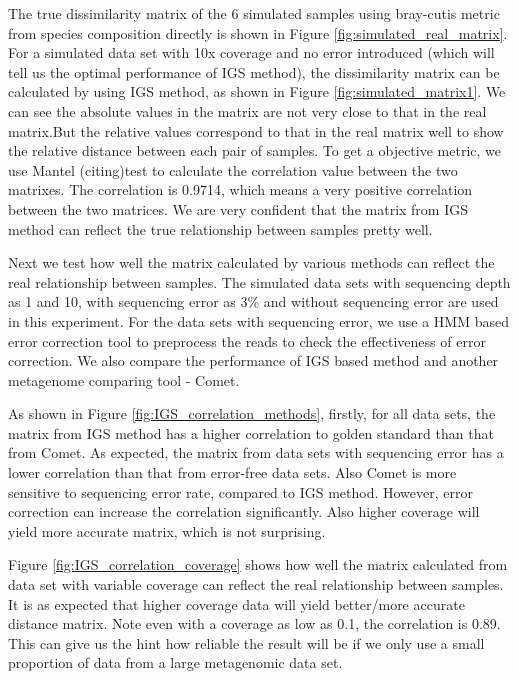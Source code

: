 The true dissimilarity matrix of the 6 simulated samples using bray-cutis metric from species composition directly is shown in Figure \ref{fig:simulated_real_matrix}.
For a simulated data set with 10x coverage and no error introduced (which will tell us the optimal performance of IGS method), the dissimilarity matrix can be calculated by using IGS method, as shown in Figure \ref{fig:simulated_matrix1}. We can see the absolute values in the matrix are not very close to that in the real matrix.But the relative values correspond to that in the real matrix well to show the relative distance between each pair of samples. To get a objective metric, we use 
Mantel (citing)test to calculate the correlation value between the two matrixes. The correlation is 0.9714, which means a very positive correlation between the two matrices. We are very confident that the matrix from IGS method can reflect the true relationship between samples pretty well.

Next we test how well the matrix calculated by various methods can reflect the real relationship between samples. 
The simulated data sets with sequencing depth as 1 and 10, with sequencing error as 3\% and without sequencing error are used in this experiment.
For the data sets with sequencing error, we use a HMM based error correction tool to preprocess the reads to check the effectiveness 
of error correction. We also  compare the performance of IGS based method and another metagenome comparing tool - Comet. 

As shown in Figure \ref{fig:IGS_correlation_methods}, firstly, for all data sets, the matrix from IGS method has a higher 
correlation to golden standard than that from Comet.  As expected, the matrix from data sets with sequencing error has a lower correlation than that from error-free
data sets. Also Comet is more sensitive to sequencing error rate, compared to IGS method.
However, error correction can increase the correlation significantly. Also higher coverage will yield more accurate matrix, which is not surprising.

Figure \ref{fig:IGS_correlation_coverage} shows how well the matrix calculated from data set with variable coverage can 
reflect the real relationship between samples. It is as expected that higher coverage data will yield better/more accurate distance matrix.
Note even with a coverage as low as 0.1, the correlation is 0.89. This can  give us the hint how reliable the result will be if 
we only use a small proportion of data from a large metagenomic data set.

